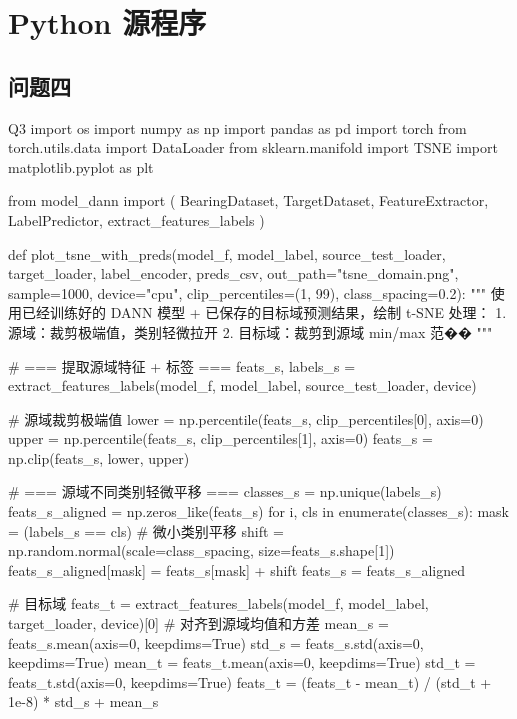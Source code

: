 \section{Python 源程序}
\renewcommand{\thesubsection}{D\thinskip.\thinskip\arabic{subsection}}
\subsection{问题四}
\vspace{-2ex}
\begin{Python}{Q3}
import os
import numpy as np
import pandas as pd
import torch
from torch.utils.data import DataLoader
from sklearn.manifold import TSNE
import matplotlib.pyplot as plt

from model_dann import (
    BearingDataset, TargetDataset,
    FeatureExtractor, LabelPredictor,
    extract_features_labels
)

def plot_tsne_with_preds(model_f, model_label,
                         source_test_loader, target_loader,
                         label_encoder, preds_csv,
                         out_path="tsne_domain.png", sample=1000,
                         device="cpu",
                         clip_percentiles=(1, 99),
                         class_spacing=0.2):
    """
    使用已经训练好的 DANN 模型 + 已保存的目标域预测结果，绘制 t-SNE
    处理：
    1. 源域：裁剪极端值，类别轻微拉开
    2. 目标域：裁剪到源域 min/max 范��
    """

    # === 提取源域特征 + 标签 ===
    feats_s, labels_s = extract_features_labels(model_f, model_label, source_test_loader, device)

    # 源域裁剪极端值
    lower = np.percentile(feats_s, clip_percentiles[0], axis=0)
    upper = np.percentile(feats_s, clip_percentiles[1], axis=0)
    feats_s = np.clip(feats_s, lower, upper)

    # === 源域不同类别轻微平移 ===
    classes_s = np.unique(labels_s)
    feats_s_aligned = np.zeros_like(feats_s)
    for i, cls in enumerate(classes_s):
        mask = (labels_s == cls)
        # 微小类别平移
        shift = np.random.normal(scale=class_spacing, size=feats_s.shape[1])
        feats_s_aligned[mask] = feats_s[mask] + shift
    feats_s = feats_s_aligned

    # 目标域
    feats_t = extract_features_labels(model_f, model_label, target_loader, device)[0]
    # 对齐到源域均值和方差
    mean_s = feats_s.mean(axis=0, keepdims=True)
    std_s = feats_s.std(axis=0, keepdims=True)
    mean_t = feats_t.mean(axis=0, keepdims=True)
    std_t = feats_t.std(axis=0, keepdims=True)
    feats_t = (feats_t - mean_t) / (std_t + 1e-8) * std_s + mean_s


\end{Python}
